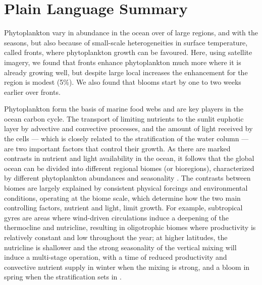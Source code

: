\section*{Plain Language Summary}
Phytoplankton vary in abundance in the ocean over of large regions, and with the seasons, but also because of small-scale heterogeneities in surface temperature, called fronts, where phytoplankton growth can be favoured.
Here, using satellite imagery, we found that fronts enhance phytoplankton much more where it is already growing well, but despite large local increases the  enhancement for the region is modest (5\%). We also found that blooms start by one to two weeks earlier over fronts.


\introduction{}

Phytoplankton form the basis of marine food webs and are key players in the ocean carbon cycle.
The transport of limiting nutrients to the sunlit euphotic layer by advective and convective processes, and the amount of light received by the cells --- which is closely related to the stratification of the water column --- are two important factors that control their growth.
As there are marked contrasts in nutrient and light availability in the ocean, it follows that the global ocean can be divided into different regional biomes (or bioregions), characterized by different phytoplankton abundances and seasonality \citep{longhurst_2007, vichi_2011a, bock_2022}.
The contrasts between biomes are largely explained by consistent physical forcings and environmental conditions, operating at the biome scale, which determine how the two main controlling factors, nutrient and light, limit growth.
For example, subtropical gyres are areas where wind-driven circulations induce a deepening of the thermocline and nutricline, resulting in oligotrophic biomes where productivity is relatively constant and low throughout the year; at higher latitudes, the nutricline is shallower and the strong seasonality of the vertical mixing will induce a multi-stage operation, with a time of reduced productivity and convective nutrient supply in winter when the mixing is strong, and a bloom in spring when the stratification sets in \citep{wilson_2005, williams_2011}.

